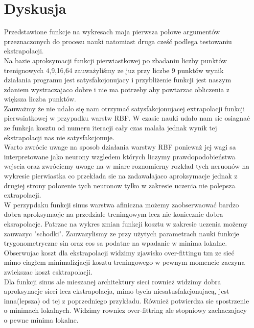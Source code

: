 \documentclass{classrep}
\begin{document}
    \section{Dyskusja}
    {
        Przedstawione funkcje na wykresach maja pierwsza połowe argumentów przeznaczonych do procesu nauki natomiast druga cześć
        podlega testowaniu ekstrapolacji.\\

        Na bazie aproksymacji funkcji pierwiastkowej po zbadaniu liczby punktów trenignowych 4,9,16,64 zauważyliśmy ze juz przy
        liczbe 9 punktów wynik działania programu jest satysfakcjonujacy i przybliżenie funkcji jest naszym zdaniem wystraczajaco dobre i nie ma
        potrzeby aby powtarzac obliczenia z większa liczba punktów. \\

        Zauważmy że nie udało się nam otrzymać satysfakcjonujacej extrapolacji funkcji pierwsiatkowej w przypadku warstw RBF.
        W czasie nauki udało nam sie osiagnać ze funkcja kosztu od numeru iteracji cały czas malała jednak wynik tej ekstrapolacji nas nie
        satysfakcjonuje.\\

        Warto zwrócic uwage na sposob działania warstwy RBF ponieważ jej wagi sa interpretowane jako neurony wzgledem których liczymy
        prawdopodobieństwa wejscia oraz zwrócicmy uwage na w miare roznomierny rozkład tych neruonów na wykresie pierwiastka co przekłada sie na zadawalajaco aproksymacje jednak z drugiej strony połozenie tych neuronow tylko w zakresie uczenia nie polepsza
        extrapolacji.\\

        W perzypdaku funkcji sinus warstwa afiniczna możemy zaobserwaować bardzo dobra aproksymacje na przedziale treningowym
        lecz nie koniecznie dobra eksrapolacje. Patrzac na wykres zmian funkcji kosztu w zakresie uczenia możemy zauwazyc "schodki".
        Zauwazylismy ze przy użytych parametrach nauki funkcje trygonometryczne sin oraz cos sa podatne na wpadanie w minima lokalne.
        Obserwujac koszt dla ekstrapolacji widzimy zjawisko over-fittingu tzn ze sieć mimo ciagłem minimalizjacji kosztu treningowego w
        pewnym momencie zaczyna zwiekszac koszt esktrapolacji.\\

        Dla funkcji sinus ale mieszanej architektury sieci rownież widzimy dobra aproksynacje sieci lecz ekstrapolacja, mimo bycia
        niesatusfakcjonujacą, jest inna(lepsza) od tej z poprzedniego przykładu. Również potwierdza sie spostrzenie o minimach lokalnych.
    Widzimy rowniez over-fittring ale stopniowy zachaczajacy o pewne minima lokalne.\\

}
\end{document}
